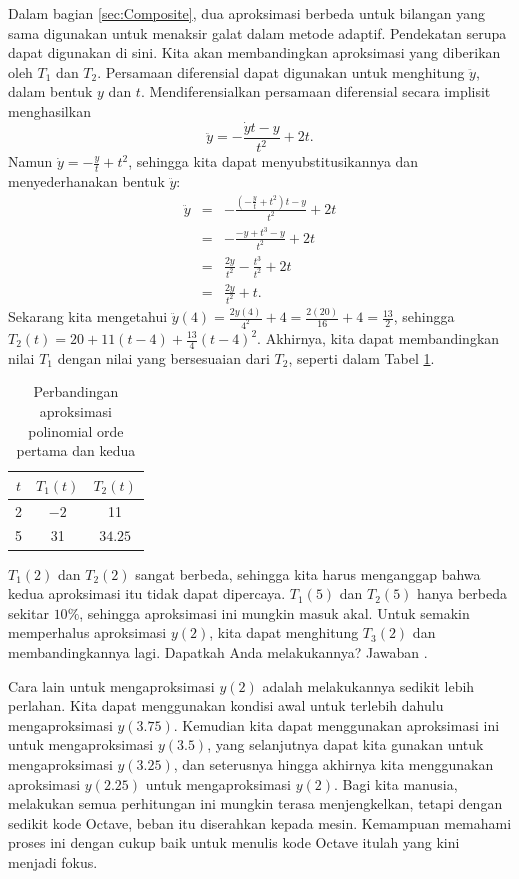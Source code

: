 Dalam bagian \ref{sec:Composite}, dua aproksimasi berbeda untuk bilangan
yang sama digunakan untuk menaksir galat dalam metode adaptif. Pendekatan
serupa dapat digunakan di sini. Kita akan membandingkan aproksimasi
yang diberikan oleh $T_{1}$ dan $T_{2}$. Persamaan diferensial dapat
digunakan untuk menghitung $\ddot{y}$, dalam bentuk $y$ dan $t$.
Mendiferensialkan persamaan diferensial secara implisit menghasilkan
\[
\ddot{y}=-\frac{\dot{y}t-y}{t^{2}}+2t.
\]
Namun $\dot{y}=-\frac{y}{t}+t^{2}$, sehingga kita dapat menyubstitusikannya
dan menyederhanakan bentuk $\ddot{y}$:
\begin{eqnarray*}
\ddot{y} & = & -\frac{(-\frac{y}{t}+t^{2})t-y}{t^{2}}+2t\\
 & = & -\frac{-y+t^{3}-y}{t^{2}}+2t\\
 & = & \frac{2y}{t^{2}}-\frac{t^{3}}{t^{2}}+2t\\
 & = & \frac{2y}{t^{2}}+t.
\end{eqnarray*}
Sekarang kita mengetahui $\ddot{y}(4)=\frac{2y(4)}{4^{2}}+4=\frac{2(20)}{16}+4=\frac{13}{2}$,
sehingga $T_{2}(t)=20+11(t-4)+\frac{13}{4}(t-4)^{2}$. Akhirnya, kita
dapat membandingkan nilai $T_{1}$ dengan nilai yang bersesuaian dari
$T_{2}$, seperti dalam Tabel \ref{tab:ode-taylor1}. 
\begin{table}
\caption{\label{tab:ode-taylor1}Perbandingan aproksimasi polinomial orde pertama
dan kedua}

\begin{centering}
\begin{tabular}{c|c|c}
$t$ & $T_{1}(t)$ & $T_{2}(t)$\tabularnewline
\hline 
2 & $-2$ & 11\tabularnewline
5 & 31 & $34.25$\tabularnewline
\end{tabular}
\par\end{centering}
\end{table}
 $T_{1}(2)$ dan $T_{2}(2)$ sangat berbeda, sehingga kita harus menganggap
bahwa kedua aproksimasi itu tidak dapat dipercaya. $T_{1}(5)$ dan
$T_{2}(5)$ hanya berbeda sekitar $10\%$, sehingga aproksimasi ini
mungkin masuk akal. Untuk semakin memperhalus aproksimasi $y(2)$,
kita dapat menghitung $T_{3}(2)$ dan membandingkannya lagi. Dapatkah
Anda melakukannya? Jawaban . 

Cara lain untuk mengaproksimasi $y(2)$ adalah melakukannya sedikit
lebih perlahan. Kita dapat menggunakan kondisi awal untuk terlebih
dahulu mengaproksimasi $y(3.75)$. Kemudian kita dapat menggunakan
aproksimasi ini untuk mengaproksimasi $y(3.5)$, yang selanjutnya
dapat kita gunakan untuk mengaproksimasi $y(3.25)$, dan seterusnya
hingga akhirnya kita menggunakan aproksimasi $y(2.25)$ untuk mengaproksimasi
$y(2)$. Bagi kita manusia, melakukan semua perhitungan ini mungkin
terasa menjengkelkan, tetapi dengan sedikit kode Octave, beban itu
diserahkan kepada mesin. Kemampuan memahami proses ini dengan cukup
baik untuk menulis kode Octave itulah yang kini menjadi fokus.

